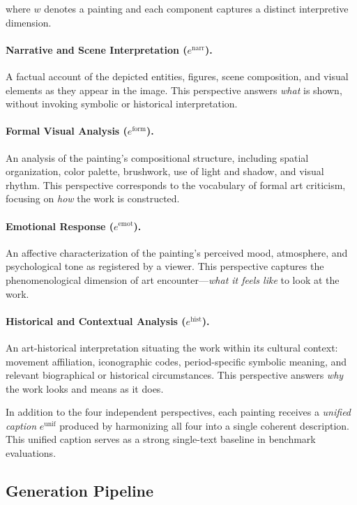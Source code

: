 where $w$ denotes a painting and each component captures a distinct interpretive dimension.

\paragraph{Narrative and Scene Interpretation ($e^{\text{narr}}$).}
A factual account of the depicted entities, figures, scene composition, and visual elements as they appear in the image.
This perspective answers \textit{what} is shown, without invoking symbolic or historical interpretation.

\paragraph{Formal Visual Analysis ($e^{\text{form}}$).}
An analysis of the painting's compositional structure, including spatial organization, color palette, brushwork, use of light and shadow, and visual rhythm.
This perspective corresponds to the vocabulary of formal art criticism, focusing on \textit{how} the work is constructed.

\paragraph{Emotional Response ($e^{\text{emot}}$).}
An affective characterization of the painting's perceived mood, atmosphere, and psychological tone as registered by a viewer.
This perspective captures the phenomenological dimension of art encounter---\textit{what it feels like} to look at the work.

\paragraph{Historical and Contextual Analysis ($e^{\text{hist}}$).}
An art-historical interpretation situating the work within its cultural context: movement affiliation, iconographic codes, period-specific symbolic meaning, and relevant biographical or historical circumstances.
This perspective answers \textit{why} the work looks and means as it does.

In addition to the four independent perspectives, each painting receives a \textit{unified caption} $e^{\text{unif}}$ produced by harmonizing all four into a single coherent description.
This unified caption serves as a strong single-text baseline in benchmark evaluations.

\subsection{Generation Pipeline}

